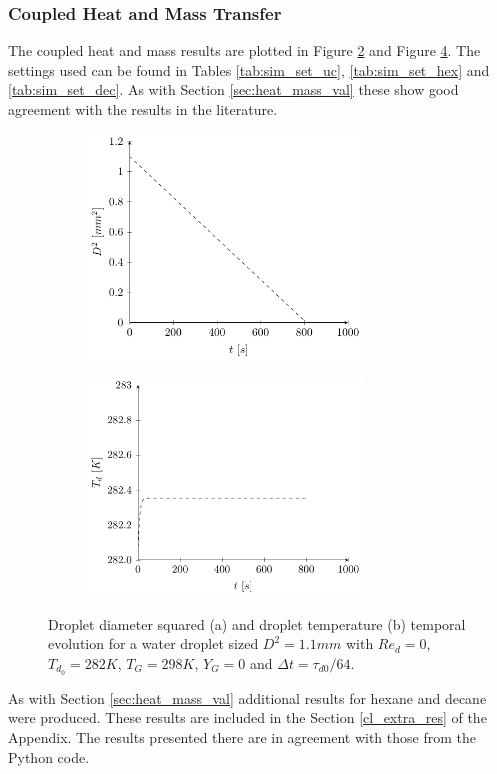 \documentclass[../Interim_Report_Master]{subfiles}
\begin{document}
\subsubsection{Coupled Heat and Mass Transfer}\label{sec:uc_temp_opencl}
The coupled heat and mass results are plotted in Figure \ref{coupled_d2_water} and Figure \ref{coupled_heat_water}. The settings used can be found in Tables \ref{tab:sim_set_uc}, \ref{tab:sim_set_hex} and \ref{tab:sim_set_dec}. As with Section \ref{sec:heat_mass_val} these show good agreement with the results in the literature. 
\begin{figure}[H]
	\centering
	\begin{subfigure}{\textwidth}
		\centering
		\includegraphics[width=0.8\textwidth]{./Diagrams/Coupled_Heat_Mass_Transfer_Verification/Coupled_D2_Transfer_Water.pdf}
		\caption{}
		\label{coupled_d2_water}
	\end{subfigure}
\end{figure}
\begin{figure}\ContinuedFloat
	\centering
	\begin{subfigure}{\textwidth}
		\centering
		\includegraphics[width=0.8\textwidth]{./Diagrams/Coupled_Heat_Mass_Transfer_Verification/Coupled_Heat_Transfer_Water.pdf}
		\caption{}
		\label{coupled_heat_water}
	\end{subfigure}
	\caption{Droplet diameter squared (a) and droplet temperature (b) temporal evolution for a water droplet sized $D^2=1.1mm$ with $Re_d=0$, $T_{d_0}=282K$, $T_G=298K$, $Y_G=0$ and $\Delta t=\tau_{d0}/64$.}
\end{figure}

As with Section \ref{sec:heat_mass_val} additional results for hexane and decane were produced. These results are included in the Section \ref{cl_extra_res} of the Appendix. The results presented there are in agreement with those from the Python code. 
\end{document}
